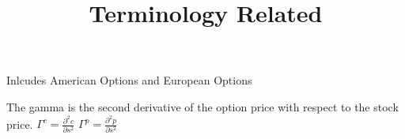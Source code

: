 \documentclass{article}
\title{Terminology Related}
\begin{document}
\maketitle


\begin{definition}
    Inlcudes American Options and European Options
\end{definition}

\begin{definition}[Gamma]
    The gamma is the second derivative of the option price with respect to the
     stock price.
     $\Gamma^{c}=\frac{\partial^2 c}{\partial s^2} $ $\Gamma^{p}=\frac{\partial^2 p}{\partial s^2} $
\end{definition}
\begin{definition}
    
\end{definition}
\end{document}
